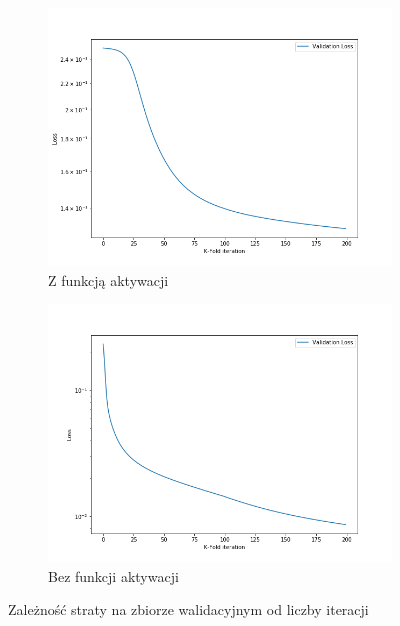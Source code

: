 \documentclass[12pt,a4paper]{article}
\begin{document}
\begin{figure}[h]
  \centering
\begin{subfigure}{0.5\textwidth}
  \includegraphics[width=\linewidth]{charts/activ_vs_noactiv/activ_extr.png}
  \caption{Z funkcją aktywacji}
  \label{}
\end{subfigure}\hfil
\begin{subfigure}{0.5\textwidth}
  \includegraphics[width=\linewidth]{charts/activ_vs_noactiv/noactiv_extr.png}
  \caption{Bez funkcji aktywacji}
  \label{}
\end{subfigure}
\caption{Zależność straty na zbiorze walidacyjnym od liczby iteracji}
\label{}
\end{figure}
\end{document}
